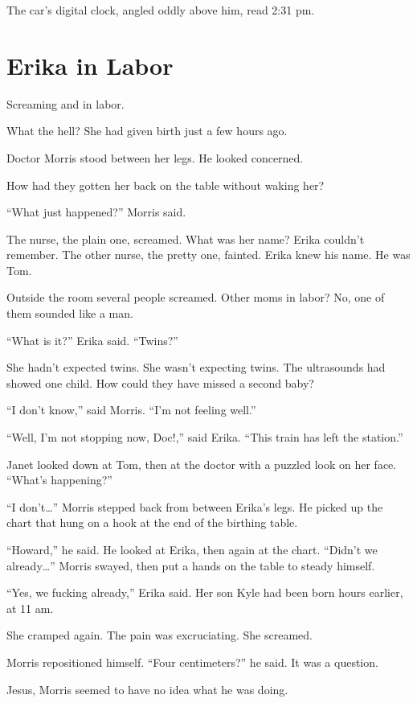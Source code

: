 The car's digital clock, angled oddly above him, read 2:31 pm.



\chapter{Erika in Labor}

 Screaming and in labor.

What the hell? She had given birth just a few hours ago.

Doctor Morris stood between her legs. He looked concerned.

How had they gotten her back on the table without waking her?

``What just happened?'' Morris said.

The nurse, the plain one, screamed. What was her name? Erika couldn't remember. The other nurse, the pretty one, fainted. Erika knew his name. He was Tom.

Outside the room several people screamed. Other moms in labor? No, one of them sounded like a man.

``What is it?'' Erika said. ``Twins?''

She hadn't expected twins. She wasn't expecting twins. The ultrasounds had showed one child. How could they have missed a second baby?

``I don't know,'' said Morris. ``I'm not feeling well.''

``Well, I'm not stopping now, Doc!,'' said Erika. ``This train has left the station.''

Janet looked down at Tom, then at the doctor with a puzzled look on her face. ``What's happening?''

``I don't…'' Morris stepped back from between Erika's legs. He picked up the chart that hung on a hook at the end of the birthing table.

``Howard,'' he said. He looked at Erika, then again at the chart. ``Didn't we already…'' Morris swayed, then put a hands on the table to steady himself.

``Yes, we fucking already,'' Erika said. Her son Kyle had been born hours earlier, at 11 am.

She cramped again. The pain was excruciating. She screamed.

Morris repositioned himself. ``Four centimeters?'' he said. It was a question.

Jesus, Morris seemed to have no idea what he was doing.

